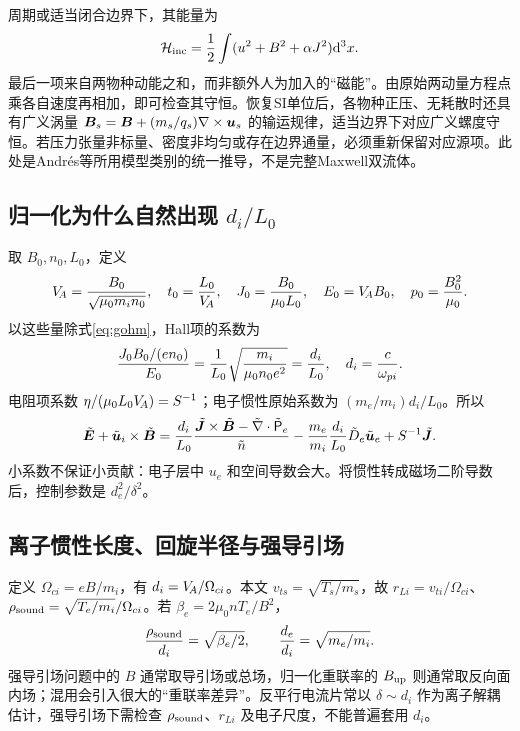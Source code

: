 周期或适当闭合边界下，其能量为
\begin{equation}
\mathcal H_{\rm inc}={1\over2}\int(u^2+B^2+\alpha J^2)\mathrm d^3x.
\end{equation}
最后一项来自两物种动能之和，而非额外人为加入的“磁能”。由原始两动量方程点乘各自速度再相加，即可检查其守恒。恢复SI单位后，各物种正压、无耗散时还具有广义涡量
$\bm{B}_s=\bm{B}+(m_s/q_s)\nabla\times\bm{u}_s$ 的输运规律，适当边界下对应广义螺度守恒。若压力张量非标量、密度非均匀或存在边界通量，必须重新保留对应源项。此处是Andr\'es等所用模型类别的统一推导，不是完整Maxwell双流体。\citep{Andres2014,Andres2016}

\subsection{归一化为什么自然出现 $d_i/L_0$}
取 $B_0,n_0,L_0$，定义
\begin{equation}V_{\!A}={B_0\over\sqrt{\mu_0m_in_0}},\quad t_0={L_0\over V_{\!A}},\quad
J_0={B_0\over\mu_0L_0},\quad E_0=V_{\!A} B_0,\quad p_0={B_0^2\over\mu_0}.
\end{equation}
以这些量除式\eqref{eq:gohm}，Hall项的系数为
\begin{equation}{J_0B_0/(en_0)\over E_0}={1\over L_0}\sqrt{m_i\over\mu_0n_0e^2}={d_i\over L_0},\quad d_i={c\over\omega_{pi}}.
\end{equation}
电阻项系数 $\eta/(\mu_0L_0V_{\!A})=S^{-1}$；电子惯性原始系数为 $(m_e/m_i)d_i/L_0$。所以
\begin{equation}\tilde{\bm{E}}+\tilde{\bm{u}}_i\times\tilde{\bm{B}}={d_i\over L_0}{\tilde{\bm{J}}\times\tilde{\bm{B}}-\tilde{\nabla}\cdot\tilde{\mathsf P}_e\over\tilde n}
-{m_e\over m_i}{d_i\over L_0}\tilde D_e\tilde{\bm{u}}_e+S^{-1}\tilde{\bm{J}}.
\end{equation}
小系数不保证小贡献：电子层中 $u_e$ 和空间导数会大。将惯性转成磁场二阶导数后，控制参数是 $d_e^2/\delta^2$。

\subsection{离子惯性长度、回旋半径与强导引场}
定义 $\Omega_{ci}=eB/m_i$，有 $d_i=V_{\!A}/\Omega_{ci}$。本文 $v_{ts}=\sqrt{T_s/m_s}$，故 $r_{Li}=v_{ti}/\Omega_{ci}$、$\rho_{\rm sound}=\sqrt{T_e/m_i}/\Omega_{ci}$。若 $\beta_e=2\mu_0nT_e/B^2$，
\begin{equation}{\rho_{\rm sound}\over d_i}=\sqrt{\beta_e/2},\qquad {d_e\over d_i}=\sqrt{m_e/m_i}.
\end{equation}
强导引场问题中的 $B$ 通常取导引场或总场，归一化重联率的 $B_{\rm up}$ 则通常取反向面内场；混用会引入很大的“重联率差异”。反平行电流片常以 $\delta\sim d_i$ 作为离子解耦估计，强导引场下需检查 $\rho_{\rm sound}$、$r_{Li}$ 及电子尺度，不能普遍套用 $d_i$。

